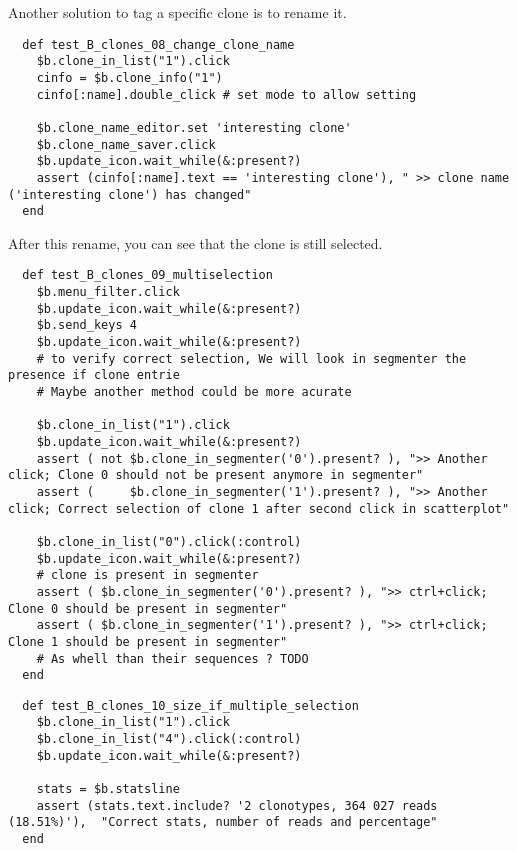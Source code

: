 Another solution to tag a specific clone is to rename it.
\begin{verbatim}
  def test_B_clones_08_change_clone_name
    $b.clone_in_list("1").click
    cinfo = $b.clone_info("1")
    cinfo[:name].double_click # set mode to allow setting

    $b.clone_name_editor.set 'interesting clone'
    $b.clone_name_saver.click
    $b.update_icon.wait_while(&:present?)
    assert (cinfo[:name].text == 'interesting clone'), " >> clone name ('interesting clone') has changed"
  end
\end{verbatim}

\bigskip

After this rename, you can see that the clone is still selected.
\begin{verbatim}
  def test_B_clones_09_multiselection
    $b.menu_filter.click
    $b.update_icon.wait_while(&:present?)
    $b.send_keys 4
    $b.update_icon.wait_while(&:present?)
    # to verify correct selection, We will look in segmenter the presence if clone entrie
    # Maybe another method could be more acurate
    
    $b.clone_in_list("1").click
    $b.update_icon.wait_while(&:present?)
    assert ( not $b.clone_in_segmenter('0').present? ), ">> Another click; Clone 0 should not be present anymore in segmenter"
    assert (     $b.clone_in_segmenter('1').present? ), ">> Another click; Correct selection of clone 1 after second click in scatterplot"
   
    $b.clone_in_list("0").click(:control)
    $b.update_icon.wait_while(&:present?)
    # clone is present in segmenter
    assert ( $b.clone_in_segmenter('0').present? ), ">> ctrl+click; Clone 0 should be present in segmenter"
    assert ( $b.clone_in_segmenter('1').present? ), ">> ctrl+click; Clone 1 should be present in segmenter"
    # As whell than their sequences ? TODO
  end
\end{verbatim}

\begin{verbatim}
  def test_B_clones_10_size_if_multiple_selection
    $b.clone_in_list("1").click
    $b.clone_in_list("4").click(:control)
    $b.update_icon.wait_while(&:present?)

    stats = $b.statsline
    assert (stats.text.include? '2 clonotypes, 364 027 reads (18.51%)'),  "Correct stats, number of reads and percentage"
  end
\end{verbatim}

